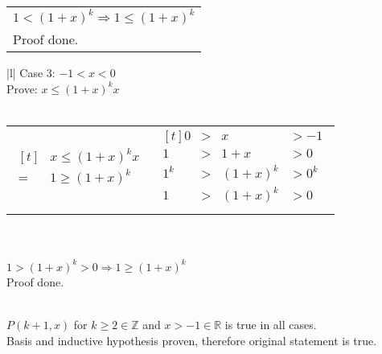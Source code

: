 \documentclass[letterpaper,fleqn,leqno]{article}
\begin{document}
\begin{enumerate}[(a)]
{\begin{tabular}{|l|}
				\\
				$1<(1+x)^k \Rightarrow 1\leq(1+x)^k$ \\
				Proof done. \\
				\hline
			\end{tabular}
			\begin{tabular}{|l|}
				\hline
				Case 3: $-1<x<0$ \\
				\hline
				Prove: $x \leq (1+x)^kx$ \\
				\\
				\begin{tabular}{l|l}
					$\begin{aligned}[t]
						& x \leq (1+x)^kx \\
						={} & 1 \geq (1+x)^k \\ 
					\end{aligned}$ &
					$\begin{aligned}[t]
						0 &>& x &>-1 \\
						1 &>& 1+x &>0 \\
						1^k &>& (1+x)^k &>0^k \\
						1 &>& (1+x)^k &>0 \\
					\end{aligned}$ \\
				\end{tabular} \\
				\\
				$1>(1+x)^k>0 \Rightarrow 1\geq(1+x)^k$ \\
				Proof done. \\
				\hline
			\end{tabular} \\
			$P(k+1,x)$ for $k\geq2\in\mathbb{Z}$ and $x>-1\in\mathbb{R}$ is true in all cases. \\
			Basis and inductive hypothesis proven, therefore original statement is true. \\
		}
\end{enumerate}
\end{document}
